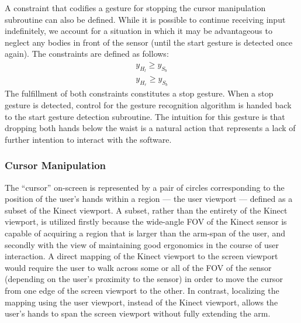 \documentclass{scrartcl}
\numberwithin{equation}{section}
\begin{document}
      A constraint that codifies a gesture for stopping the cursor manipulation subroutine can also be defined. While it is possible to continue receiving input indefinitely, we account for a situation in which it may be advantageous to neglect any bodies in front of the sensor (until the start gesture is detected once again). The constraints are defined as follows:
      \begin{align}
        y_{H_l} \geq y_{S_b} \label{eq:stop1} \\
        y_{H_r} \geq y_{S_b} \label{eq:stop2}
      \end{align}
      The fulfillment of both constraints constitutes a stop gesture. When a stop gesture is detected, control for the gesture recognition algorithm is handed back to the start gesture detection subroutine. The intuition for this gesture is that dropping both hands below the waist is a natural action that represents a lack of further intention to interact with the software.
      \subsubsection{Cursor Manipulation}
      The ``cursor'' on-screen is represented by a pair of circles corresponding to the position of the user's hands within a region --- the user viewport --- defined as a subset of the Kinect viewport. A subset, rather than the entirety of the Kinect viewport, is utilized firstly because the wide-angle FOV of the Kinect sensor is capable of acquiring a region that is larger than the arm-span of the user, and secondly with the view of maintaining good ergonomics in the course of user interaction. A direct mapping of the Kinect viewport to the screen viewport would require the user to walk across some or all of the FOV of the sensor (depending on the user's proximity to the sensor) in order to move the cursor from one edge of the screen viewport to the other. In contrast, localizing the mapping using the user viewport, instead of the Kinect viewport, allows the user's hands to span the screen viewport without fully extending the arm.
\end{document}
